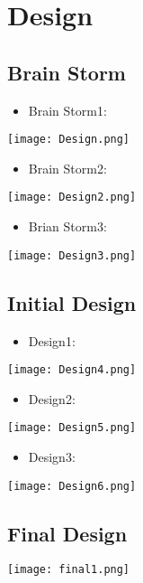 \documentclass[11pt]{article}
\begin{document}
\section{Design}
\label{sec-4}



\subsection{Brain Storm}
\label{sec-4-1}

\begin{itemize}
\item Brain Storm1:
\end{itemize}
\texttt{[image: Design.png]}

\begin{itemize}
\item Brain Storm2:
\end{itemize}
\texttt{[image: Design2.png]}

\begin{itemize}
\item Brian Storm3:
\end{itemize}
\texttt{[image: Design3.png]}
\subsection{Initial Design}
\label{sec-4-2}

\begin{itemize}
\item Design1:
\end{itemize}
\texttt{[image: Design4.png]}

\begin{itemize}
\item Design2:
\end{itemize}
\texttt{[image: Design5.png]}

\begin{itemize}
\item Design3:
\end{itemize}
\texttt{[image: Design6.png]}

\subsection{Final Design}
\label{sec-4-3}

\texttt{[image: final1.png]}
\end{document}
